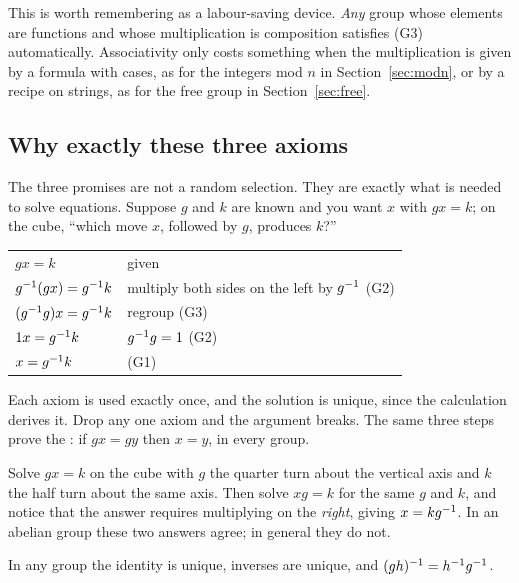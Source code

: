 \begin{bigpic}
This is worth remembering as a labour-saving device. \emph{Any} group whose elements are functions
and whose multiplication is composition satisfies (G3) automatically. Associativity only costs
something when the multiplication is given by a formula with cases, as for the integers mod $n$ in
Section~\ref{sec:modn}, or by a recipe on strings, as for the free group in
Section~\ref{sec:free}.
\end{bigpic}

\subsection{Why exactly these three axioms}

The three promises are not a random selection. They are exactly what is needed to solve equations.
Suppose $g$ and $k$ are known and you want $x$ with $gx=k$; on the cube, ``which move $x$, followed
by $g$, produces $k$?''

\begin{center}
\small
\begin{tabular}{@{}ll@{}}
$gx=k$ & given\\
$g^{-1}(gx)=g^{-1} k$ & multiply both sides on the left by $g^{-1}$ \hfill (G2)\\
$(g^{-1} g)x=g^{-1} k$ & regroup \hfill (G3)\\
$1x=g^{-1} k$ & $g^{-1} g=1$ \hfill (G2)\\
$x=g^{-1} k$ & \hfill (G1)\\
\end{tabular}
\end{center}

Each axiom is used exactly once, and the solution is unique, since the calculation derives it.
Drop any one axiom and the argument breaks. The same three steps prove the
: if $gx=gy$ then $x=y$, in every group.

\begin{tryit}
Solve $gx=k$ on the cube with $g$ the quarter turn about the vertical axis and $k$ the half turn
about the same axis. Then solve $xg=k$ for the same $g$ and $k$, and notice that the answer requires
multiplying on the \emph{right}, giving $x=kg^{-1}$. In an abelian group these two answers agree; in
general they do not.
\end{tryit}

\begin{prop}
In any group the identity is unique, inverses are unique, and $(gh)^{-1}=h^{-1} g^{-1}$.
\end{prop}

